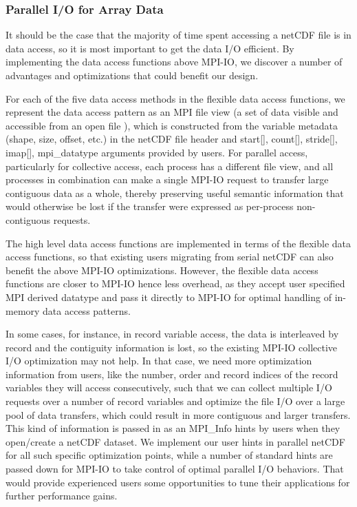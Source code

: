 \documentclass[10pt,twocolumn]{article}          %
\begin{document}
\subsubsection{Parallel I/O for Array Data}

It should be the case that the majority of time spent accessing a netCDF file is in data access, so
it is most important to get the data I/O efficient. By implementing the data access functions above
MPI-IO, we discover a number of advantages and optimizations that could benefit our design.

For each of the five data access methods in the flexible data access functions, we represent the
data access pattern as an MPI file view (a set of data visible and accessible from an open file
\cite{Mess97}), which is constructed from the variable metadata (shape, size, offset, etc.) in the
netCDF file header and start[], count[], stride[], imap[], mpi\_datatype arguments provided by
users. For parallel access, particularly for collective access, each process has a different file
view, and all processes in combination can make a single MPI-IO request to transfer large
contiguous data as a whole, thereby preserving useful semantic information that would otherwise be
lost if the transfer were expressed as per-process non-contiguous requests.

The high level data access functions are implemented in terms of the flexible data access
functions, so that existing users migrating from serial netCDF can also benefit the above MPI-IO
optimizations. However, the flexible data access functions are closer to MPI-IO hence less
overhead, as they accept user specified MPI derived datatype and pass it directly to MPI-IO for
optimal handling of in-memory data access patterns.

In some cases, for instance, in record variable access, the data is interleaved by record and the
contiguity information is lost, so the existing MPI-IO collective I/O optimization may not help. In
that case, we need more optimization information from users, like the number, order and record
indices of the record variables they will access consecutively, such that we can collect multiple
I/O requests over a number of record variables and optimize the file I/O over a large pool of data
transfers, which could result in more contiguous and larger transfers. This kind of information is
passed in as an MPI\_Info hints by users when they open/create a netCDF dataset. We implement our
user hints in parallel netCDF for all such specific optimization points, while a number of standard
hints are passed down for MPI-IO to take control of optimal parallel I/O behaviors. That would
provide experienced users some opportunities to tune their applications for further performance
gains.
\end{document}
